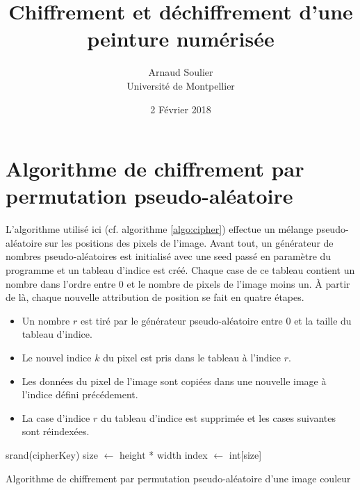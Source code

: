\documentclass[a4paper]{article}
\title{Chiffrement et déchiffrement d'une peinture numérisée}
\author{Arnaud Soulier\\Université de Montpellier}
\date{2 Février 2018}
\begin{document}
    \maketitle

    \newpage

    \section{Algorithme de chiffrement par permutation pseudo-aléatoire}

        L'algorithme utilisé ici (cf. algorithme \ref{algo:cipher}) effectue un mélange pseudo-aléatoire sur les positions des pixels de l'image. Avant tout, un générateur de nombres pseudo-aléatoires est initialisé avec une seed passé en paramètre du programme et un tableau d'indice est créé. Chaque case de ce tableau contient un nombre dans l'ordre entre 0 et le nombre de pixels de l'image moins un. À partir de là, chaque nouvelle attribution de position se fait en quatre étapes.
        \begin{itemize}
            \item Un nombre $r$ est tiré par le générateur pseudo-aléatoire entre 0 et la taille du tableau d'indice.
            \item Le nouvel indice $k$ du pixel est pris dans le tableau à l'indice $r$.
            \item Les données du pixel de l'image sont copiées dans une nouvelle image à l'indice défini précédement.
            \item La case d'indice $r$ du tableau d'indice est supprimée et les cases suivantes sont réindexées.
        \end{itemize}

        \begin{algorithm}[htbp]
            \SetAlgoLined
            srand(cipherKey)\;
            size $\leftarrow$ height * width\;
            index $\leftarrow$ int[size]\;
            \caption{Algorithme de chiffrement par permutation pseudo-aléatoire d'une image couleur}
            \label{algo:cipher}
        \end{algorithm}
\end{document}
